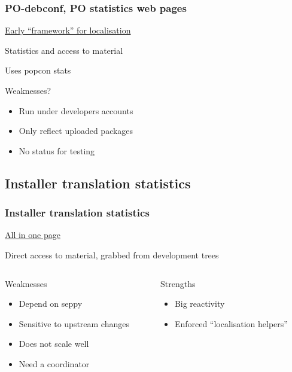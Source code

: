 \documentclass{beamer}
\begin{document}
\begin{frame}
  \frametitle{PO-debconf, PO statistics web pages}
	\begin{block}
		{\href{http://www.debian.org/intl/l10n/po-debconf/fr}{Early ``framework'' for localisation}}
	\end{block}
	\begin{block}
		{Statistics and access to material}
	\end{block}
	\begin{block}
		{Uses popcon stats}
	\end{block}
	\begin{block}
		{Weaknesses?}
		\begin{itemize}
		\item
			Run under developers accounts
		\item
			Only reflect uploaded packages
		\item
			No status for testing
		\end{itemize}
	\end{block}
\end{frame}
	
\subsection{Installer translation statistics}

\begin{frame}
  \frametitle{Installer translation statistics}
	\begin{block}
		{\href{http://people.debian.org/~seppy/d-i/translation-status.html}{All in one page}}
	\end{block}
	\begin{block}
		{Direct access to material, grabbed from development trees}
	\end{block}
  \begin{columns}
    \begin{column}{4.5cm}
	\begin{block}
		{Weaknesses}
		\begin{itemize}
		\item
			Depend on seppy
		\item
			Sensitive to upstream changes
		\item
			Does not scale well
		\item
			Need a coordinator
		\end{itemize}
	\end{block}
    \end{column}
    \begin{column}{4.5cm}
	\begin{block}
		{Strengths}
		\begin{itemize}
		\item
			Big reactivity
		\item
			Enforced ``localisation helpers''
		\end{itemize}
	\end{block}
    \end{column}
  \end{columns}
\end{frame}
\end{document}
